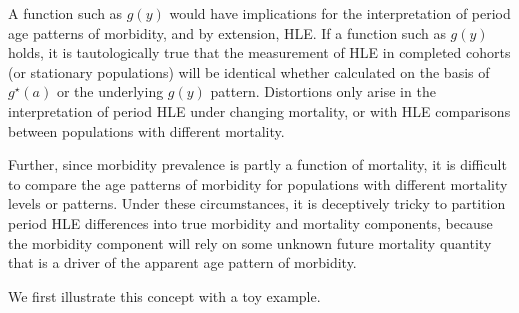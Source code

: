 \documentclass[11pt,oneside,a4paper]{article} %
\begin{document}
A function such as $g(y)$ would have implications for the interpretation of
period age patterns of morbidity, and by extension, HLE. If a function such as $g(y)$ holds, it is tautologically true that the
measurement of HLE in completed cohorts (or stationary populations)
will be identical whether calculated on the basis of $g^\star(a)$ or the underlying $g(y)$ pattern. Distortions only arise in the interpretation of
period HLE under changing mortality, or with HLE comparisons between
populations with different mortality.


Further, since morbidity prevalence is partly a function of mortality, it is
difficult to compare the age patterns of morbidity for populations with different mortality
levels or patterns. Under these circumstances, it is deceptively tricky to
partition period HLE differences into true morbidity and mortality
components, because the morbidity component will rely on some unknown future mortality quantity that is a driver of the apparent age pattern of morbidity.
 
We first illustrate this concept with a toy example. 
\end{document}
